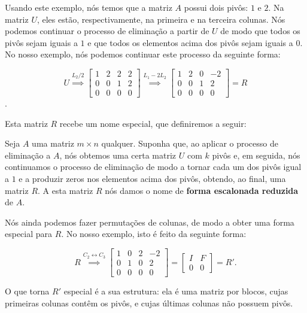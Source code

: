 Usando este exemplo, nós temos que a matriz $A$ possui dois pivôs: $1$ e $2$. Na matriz $U$, eles estão, respectivamente, na primeira e na terceira colunas. Nós podemos continuar o processo de eliminação a partir de $U$ de modo que todos os pivôs sejam iguais a $1$ e que todos os elementos acima dos pivôs sejam iguais a $0$. No nosso exemplo, nós podemos continuar este processo da seguinte forma:

$$
U\overset{L_2/2}{\implies}
\begin{bmatrix}
	1 & 2 & 2 & 2 \\
	0 & 0 & 1 & 2 \\
	0 & 0 & 0 & 0
\end{bmatrix}\overset{L_1 - 2L_2}{\implies}
\begin{bmatrix}
	1 & 2 & 0 & -2 \\
	0 & 0 & 1 & 2 \\
	0 & 0 & 0 & 0
\end{bmatrix} = R
$$.

Esta matriz $R$ recebe um nome especial, que definiremos a seguir:

\begin{Definition}
	Seja $A$ uma matriz $m\times n$ qualquer. Suponha que, ao aplicar o processo de eliminação a $A$, nós obtemos uma certa matriz $U$ com $k$ pivôs e, em seguida, nós continuamos o processo de eliminação de modo a tornar cada um dos pivôs igual a $1$ e a produzir zeros nos elementos acima dos pivôs, obtendo, ao final, uma matriz $R$. A esta matriz $R$ nós damos o nome de \textbf{forma escalonada reduzida} de $A$.
\end{Definition}

Nós ainda podemos fazer permutações de colunas, de modo a obter uma forma especial para $R$. No nosso exemplo, isto é feito da seguinte forma:

$$
R\overset{C_2\leftrightarrow C_3}{\implies}
\begin{bmatrix}
	1 & 0 & 2 & -2 \\
	0 & 1 & 0 & 2 \\
	0 & 0 & 0 & 0
\end{bmatrix} = \begin{bmatrix}
	I & F \\
	0 & 0
\end{bmatrix} = R'.
$$

O que torna $R'$ especial é a sua estrutura: ela é uma matriz por blocos, cujas primeiras colunas contêm os pivôs, e cujas últimas colunas não possuem pivôs.

